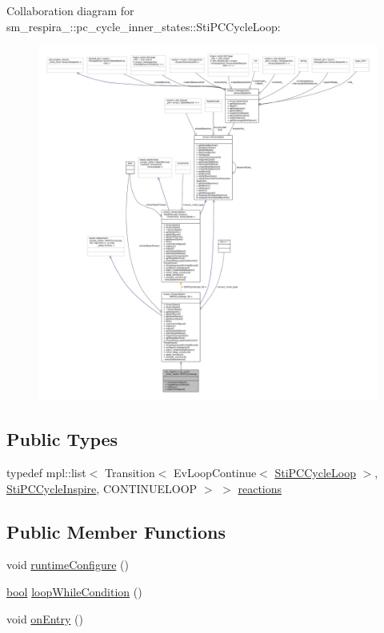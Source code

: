 Collaboration diagram for sm\+\_\+respira\+\_\+:\+:pc\+\_\+cycle\+\_\+inner\+\_\+states\+:\+:Sti\+P\+C\+Cycle\+Loop\+:
\nopagebreak
\begin{figure}[H]
\begin{center}
\leavevmode
\includegraphics[width=350pt]{structsm__respira__1_1_1pc__cycle__inner__states_1_1StiPCCycleLoop__coll__graph}
\end{center}
\end{figure}
\subsection*{Public Types}
\begin{DoxyCompactItemize}
\item 
typedef mpl\+::list$<$ Transition$<$ Ev\+Loop\+Continue$<$ \hyperlink{structsm__respira__1_1_1pc__cycle__inner__states_1_1StiPCCycleLoop}{Sti\+P\+C\+Cycle\+Loop} $>$, \hyperlink{structsm__respira__1_1_1pc__cycle__inner__states_1_1StiPCCycleInspire}{Sti\+P\+C\+Cycle\+Inspire}, C\+O\+N\+T\+I\+N\+U\+E\+L\+O\+OP $>$ $>$ \hyperlink{structsm__respira__1_1_1pc__cycle__inner__states_1_1StiPCCycleLoop_a0577075a5767b310721c5730b44ad1ad}{reactions}
\end{DoxyCompactItemize}
\subsection*{Public Member Functions}
\begin{DoxyCompactItemize}
\item 
void \hyperlink{structsm__respira__1_1_1pc__cycle__inner__states_1_1StiPCCycleLoop_a4ce8257f51c7d134bf125e3585d5731b}{runtime\+Configure} ()
\item 
\hyperlink{classbool}{bool} \hyperlink{structsm__respira__1_1_1pc__cycle__inner__states_1_1StiPCCycleLoop_adecc8cd6a0ae369ee8a6df33bcff8cb7}{loop\+While\+Condition} ()
\item 
void \hyperlink{structsm__respira__1_1_1pc__cycle__inner__states_1_1StiPCCycleLoop_aae3becd89262e6d935994c17c3b3913c}{on\+Entry} ()
\end{DoxyCompactItemize}
